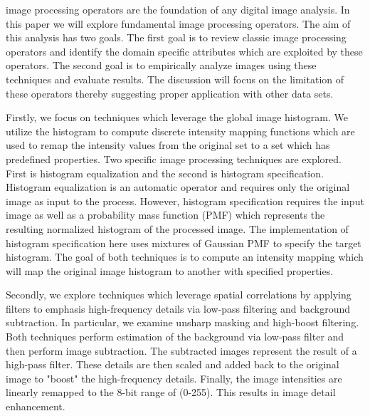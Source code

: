 \documentclass[journal]{IEEEtran}
\begin{document}
 image processing operators are the foundation of any digital image analysis. In this paper we will explore fundamental image processing operators. The aim of this analysis has two goals. The first goal is to review classic image processing operators and identify the domain specific attributes which are exploited by these operators. The second goal is to empirically analyze images using these techniques and evaluate results. The discussion will focus on the limitation of these operators thereby suggesting proper application with other data sets.

\par Firstly, we focus on techniques which leverage the global image histogram. We utilize the histogram to compute discrete intensity mapping functions which are used to remap the intensity values from the original set to a set which has predefined properties. Two specific image processing techniques are explored. First is histogram equalization and the second is histogram specification. Histogram equalization is an automatic operator and requires only the original image as input to the process. However, histogram specification requires the input image as well as a probability mass function (PMF) which represents the resulting normalized histogram of the processed image. The implementation of histogram specification here uses mixtures of Gaussian PMF to specify the target histogram. The goal of both techniques is to compute an intensity mapping which will map the original image histogram to another with specified properties. \cite[p.~120-138]{Gonzalez}

\par Secondly, we explore techniques which leverage spatial correlations by applying filters to emphasis high-frequency details via low-pass filtering and background subtraction. In particular, we examine unsharp masking and high-boost filtering. Both techniques perform estimation of the background via low-pass filter and then perform image subtraction. The subtracted images represent the result of a high-pass filter. These details are then scaled and added back to the original image to "boost" the high-frequency details. Finally, the image intensities are linearly remapped to the 8-bit range of (0-255). This results in image detail enhancement. \cite[p.~162-165]{Gonzalez}
\end{document}
